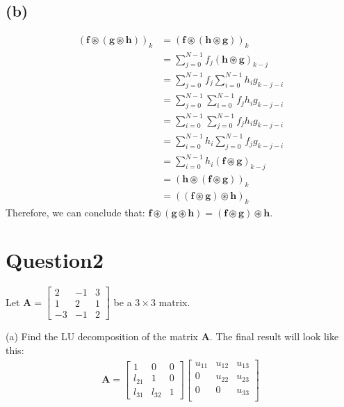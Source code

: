 \documentclass{article}
\begin{document}
\subsection*{(b)}
\begin{align*}
    (\bm{f} \circledast (\bm{g} \circledast \bm{h}))_k &= (\bm{f} \circledast (\bm{h} \circledast \bm{g}))_k \\ 
    &= \sum_{j = 0}^{N-1} f_j(\bm{h} \circledast \bm{g})_{k - j} \\
    &= \sum_{j = 0}^{N-1} f_j \sum_{i = 0}^{N-1} h_i g_{k - j - i} \\
    &= \sum_{j = 0}^{N-1}  \sum_{i = 0}^{N-1} f_j h_i g_{k - j - i} \\
    &= \sum_{i = 0}^{N-1} \sum_{j = 0}^{N-1} f_j h_i g_{k - j - i} \\
    &= \sum_{i = 0}^{N-1} h_i \sum_{j = 0}^{N-1} f_j  g_{k - j - i} \\
    &= \sum_{i = 0}^{N-1} h_i(\bm{f} \circledast \bm{g})_{k - j} \\
    &= (\bm{h} \circledast (\bm{f} \circledast \bm{g}))_k \\
    &= ((\bm{f} \circledast \bm{g}) \circledast \bm{h})_k
\end{align*}
Therefore, we can conclude that: \(\bm{f}\circledast (\bm{g} \circledast \bm{h}) = (\bm{f} \circledast \bm{g}) \circledast \bm{h}\). 

\section*{Question2}
Let \(\bm{A} = \begin{bmatrix}
   2 &-1 &3 \\
   1 & 2& 1 \\
   -3 &-1 &2 
\end{bmatrix}\) be a \(3 \times 3\) matrix.

\noindent 
(a) Find the LU decomposition of the matrix \(\bm{A}\). The final result will look like this:
\begin{align*}
    \bm{A} = \begin{bmatrix}
        1 & 0 & 0 \\
        l_{21} & 1 & 0 \\
        l_{31} & l_{32} & 1 
    \end{bmatrix} \begin{bmatrix}
        u_{11} &u_{12} &u_{13}   \\
        0 &u_{22} &u_{23}   \\
        0 &0 &u_{33}   \\
    \end{bmatrix}
\end{align*}
\end{document}
